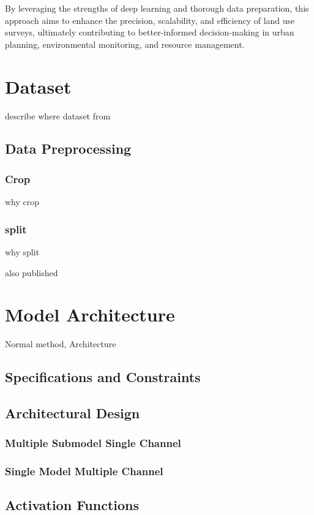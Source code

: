\documentclass[conference]{IEEEtran}
\begin{document}
By leveraging the strengths of deep learning and thorough data preparation, this approach aims to enhance the precision, scalability, and efficiency of land use surveys, ultimately contributing to better-informed decision-making in urban planning, environmental monitoring, and resource management.



\section{Dataset}
describe where dataset from
\subsection{Data Preprocessing}
\subsubsection{Crop}
why crop

\subsubsection{split}
why split

also published

\section{Model Architecture}

Normal method, Architecture

\subsection*{Specifications and Constraints}
\subsection{Architectural Design}
\subsubsection{Multiple Submodel Single Channel}
\subsubsection{Single Model Multiple Channel}
\subsection{Activation Functions}
\end{document}
